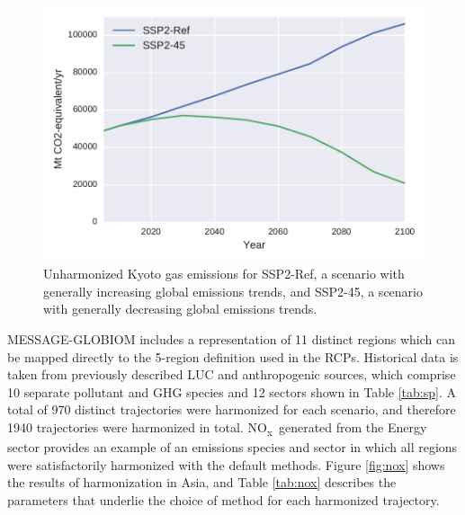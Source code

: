 \documentclass[review]{elsarticle}
\newcommand{\noxx}{NO\textsubscript{x}~}
\begin{document}
\begin{figure}
  \begin{center}
    \includegraphics[width=\textwidth]{results_kyoto.pdf}
    \caption[]{
      \label{fig:kyoto}
      Unharmonized Kyoto gas emissions for SSP2-Ref, a scenario with generally
      increasing global emissions trends, and SSP2-45, a scenario with generally
      decreasing global emissions trends.  }
  \end{center}
\end{figure}


MESSAGE-GLOBIOM includes a representation of 11 distinct regions which can be
mapped directly to the 5-region definition used in the RCPs. Historical data is
taken from previously described LUC and anthropogenic sources, which comprise 10
separate pollutant and GHG species and 12 sectors shown in Table \ref{tab:sp}. A
total of 970 distinct trajectories were harmonized for each scenario, and
therefore 1940 trajectories were harmonized in total. \noxx generated from the
Energy sector provides an example of an emissions species and sector in which
all regions were satisfactorily harmonized with the default methods. Figure
\ref{fig:nox} shows the results of harmonization in Asia, and Table
\ref{tab:nox} describes the parameters that underlie the choice of method for
each harmonized trajectory.
\end{document}
